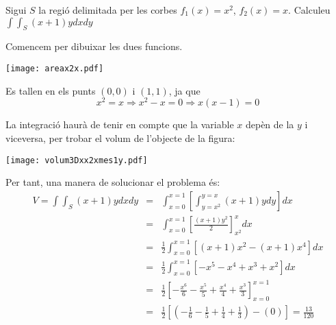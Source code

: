 

\Exercise[title={Integral delimitada entre funcions}]

\Question
Sigui $S$ la regió delimitada  per les corbes $f_1(x)=x^2$, $f_2(x)=x$. Calculeu $\int \int_S (x+1)y dxdy$


\Answer


Comencem per dibuixar les dues funcions.

    \begin{center}
      \texttt{[image: areax2x.pdf]}
    \end{center}

Es tallen en els punts $(0,0)$ i $(1,1)$, ja que
\[
  x^2=x \Rightarrow x^2-x=0 \Rightarrow x(x-1)=0
\]

La integració haurà de tenir en compte que la variable $x$ depèn de la $y$ i viceversa, per trobar el volum de l'objecte de la figura:

\begin{center}
  \texttt{[image: volum3Dxx2xmes1y.pdf]}
\end{center}

Per tant, una manera de solucionar el problema és:
\begin{eqnarray*}
V=\int \int_S (x+1)y dx dy &=& \int_{x=0}^{x=1} \left[ \int_{y=x^2}^{y=x} (x+1)y dy \right]dx \\
&=& \int_{x=0}^{x=1} \left[ \frac{(x+1)y^2}{2} \right]_{x^2}^{x} dx \\
&=& \frac{1}{2}\int_{x=0}^{x=1} \left[ (x+1)x^2 - (x+1)x^4 \right] dx\\
&=& \frac{1}{2}\int_{x=0}^{x=1} \left[ -x^5-x^4+x^3+x^2  \right] dx\\
&=& \frac{1}{2} \left[ -\frac{x^6}{6}-\frac{x^5}{5}+\frac{x^4}{4}+\frac{x^3}{3}\right]_{x=0}^{x=1}\\
&=& \frac{1}{2}\left[ \left(-\frac{1}{6}-\frac{1}{5}+\frac{1}{4}+\frac{1}{3}\right)-\left(0\right)\right]=\frac{13}{120}
\end{eqnarray*}


